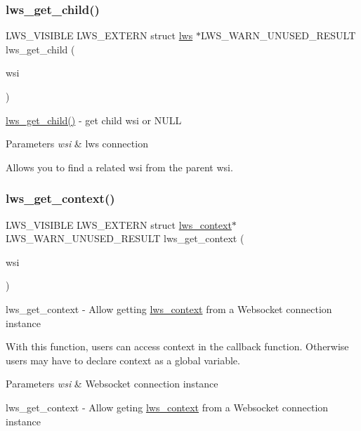 \subsubsection{\texorpdfstring{lws\+\_\+get\+\_\+child()}{lws\_get\_child()}}
{\footnotesize\ttfamily L\+W\+S\+\_\+\+V\+I\+S\+I\+B\+LE L\+W\+S\+\_\+\+E\+X\+T\+E\+RN struct \hyperlink{structlws}{lws} $\ast$L\+W\+S\+\_\+\+W\+A\+R\+N\+\_\+\+U\+N\+U\+S\+E\+D\+\_\+\+R\+E\+S\+U\+LT lws\+\_\+get\+\_\+child (\begin{DoxyParamCaption}\item[{const struct \hyperlink{structlws}{lws} $\ast$}]{wsi }\end{DoxyParamCaption})}

\hyperlink{group__misc_ga7fc9fe90471eb724ba314baa21e5e18c}{lws\+\_\+get\+\_\+child()} -\/ get child wsi or N\+U\+LL 
\begin{DoxyParams}{Parameters}
{\em wsi} & lws connection\\
\hline
\end{DoxyParams}
Allows you to find a related wsi from the parent wsi. \mbox{\label{group__misc_ga0af4f7d2dd375aeedcfa7eb0e1101c4b}} 
\subsubsection{\texorpdfstring{lws\+\_\+get\+\_\+context()}{lws\_get\_context()}}
{\footnotesize\ttfamily L\+W\+S\+\_\+\+V\+I\+S\+I\+B\+LE L\+W\+S\+\_\+\+E\+X\+T\+E\+RN struct \hyperlink{structlws__context}{lws\+\_\+context}$\ast$ L\+W\+S\+\_\+\+W\+A\+R\+N\+\_\+\+U\+N\+U\+S\+E\+D\+\_\+\+R\+E\+S\+U\+LT lws\+\_\+get\+\_\+context (\begin{DoxyParamCaption}\item[{const struct \hyperlink{structlws}{lws} $\ast$}]{wsi }\end{DoxyParamCaption})}

lws\+\_\+get\+\_\+context -\/ Allow getting \hyperlink{structlws__context}{lws\+\_\+context} from a Websocket connection instance

With this function, users can access context in the callback function. Otherwise users may have to declare context as a global variable.


\begin{DoxyParams}{Parameters}
{\em wsi} & Websocket connection instance\\
\hline
\end{DoxyParams}
lws\+\_\+get\+\_\+context -\/ Allow geting \hyperlink{structlws__context}{lws\+\_\+context} from a Websocket connection instance

